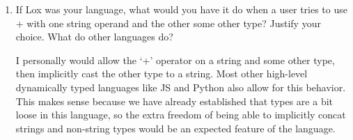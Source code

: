 \documentclass{article}
\begin{document}
\begin{enumerate}
{\begin{verbatim}
// memory.c 
void freeObject(Obj* object) {
    switch (object->type) {
        case OBJ_STRING: {
            ObjString* string = (ObjString*)object;
            if (!string->isLiteral) {
                FREE_ARRAY(char, string->chars, string->length+1);
            }
            
            FREE(ObjString, object);
            break;
        }
    }
}

        \end{verbatim}
    }

    \item {
        If Lox was your language, what would you have it do when a user tries to use + with one string operand and the other some other type? Justify your choice. What do other languages do?

        I personally would allow the `+' operator on a string and some other type, 
        then implicitly cast the other type to a string. Most other high-level 
        dynamically typed languages like JS and Python also allow for this behavior.
        This makes sense because we have already established that types are a bit 
        loose in this language, so the extra freedom of being able to implicitly 
        concat strings and non-string types would be an expected feature of the 
        language.
    }
\end{enumerate}
\end{document}
